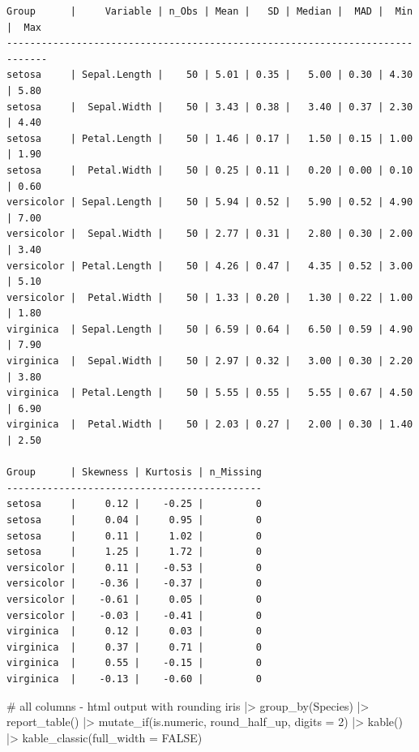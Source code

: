 \documentclass[
  letterpaper,
  DIV=11,
  numbers=noendperiod]{scrreprt}
\newenvironment{Shaded}{\begin{snugshade}}{\end{snugshade}}
\newcommand{\AttributeTok}[1]{\textcolor[rgb]{0.40,0.45,0.13}{#1}}
\newcommand{\CommentTok}[1]{\textcolor[rgb]{0.37,0.37,0.37}{#1}}
\newcommand{\ConstantTok}[1]{\textcolor[rgb]{0.56,0.35,0.01}{#1}}
\newcommand{\DecValTok}[1]{\textcolor[rgb]{0.68,0.00,0.00}{#1}}
\newcommand{\FunctionTok}[1]{\textcolor[rgb]{0.28,0.35,0.67}{#1}}
\newcommand{\NormalTok}[1]{\textcolor[rgb]{0.00,0.23,0.31}{#1}}
\newcommand{\SpecialCharTok}[1]{\textcolor[rgb]{0.37,0.37,0.37}{#1}}
\begin{document}
\begin{verbatim}
Group      |     Variable | n_Obs | Mean |   SD | Median |  MAD |  Min |  Max
-----------------------------------------------------------------------------
setosa     | Sepal.Length |    50 | 5.01 | 0.35 |   5.00 | 0.30 | 4.30 | 5.80
setosa     |  Sepal.Width |    50 | 3.43 | 0.38 |   3.40 | 0.37 | 2.30 | 4.40
setosa     | Petal.Length |    50 | 1.46 | 0.17 |   1.50 | 0.15 | 1.00 | 1.90
setosa     |  Petal.Width |    50 | 0.25 | 0.11 |   0.20 | 0.00 | 0.10 | 0.60
versicolor | Sepal.Length |    50 | 5.94 | 0.52 |   5.90 | 0.52 | 4.90 | 7.00
versicolor |  Sepal.Width |    50 | 2.77 | 0.31 |   2.80 | 0.30 | 2.00 | 3.40
versicolor | Petal.Length |    50 | 4.26 | 0.47 |   4.35 | 0.52 | 3.00 | 5.10
versicolor |  Petal.Width |    50 | 1.33 | 0.20 |   1.30 | 0.22 | 1.00 | 1.80
virginica  | Sepal.Length |    50 | 6.59 | 0.64 |   6.50 | 0.59 | 4.90 | 7.90
virginica  |  Sepal.Width |    50 | 2.97 | 0.32 |   3.00 | 0.30 | 2.20 | 3.80
virginica  | Petal.Length |    50 | 5.55 | 0.55 |   5.55 | 0.67 | 4.50 | 6.90
virginica  |  Petal.Width |    50 | 2.03 | 0.27 |   2.00 | 0.30 | 1.40 | 2.50

Group      | Skewness | Kurtosis | n_Missing
--------------------------------------------
setosa     |     0.12 |    -0.25 |         0
setosa     |     0.04 |     0.95 |         0
setosa     |     0.11 |     1.02 |         0
setosa     |     1.25 |     1.72 |         0
versicolor |     0.11 |    -0.53 |         0
versicolor |    -0.36 |    -0.37 |         0
versicolor |    -0.61 |     0.05 |         0
versicolor |    -0.03 |    -0.41 |         0
virginica  |     0.12 |     0.03 |         0
virginica  |     0.37 |     0.71 |         0
virginica  |     0.55 |    -0.15 |         0
virginica  |    -0.13 |    -0.60 |         0
\end{verbatim}

\begin{Shaded}
\begin{Highlighting}[]
\CommentTok{\# all columns {-} html output with rounding}
\NormalTok{iris }\SpecialCharTok{|\textgreater{}}
  \FunctionTok{group\_by}\NormalTok{(Species) }\SpecialCharTok{|\textgreater{}}
  \FunctionTok{report\_table}\NormalTok{() }\SpecialCharTok{|\textgreater{}}
  \FunctionTok{mutate\_if}\NormalTok{(is.numeric, round\_half\_up, }\AttributeTok{digits =} \DecValTok{2}\NormalTok{) }\SpecialCharTok{|\textgreater{}}
  \FunctionTok{kable}\NormalTok{() }\SpecialCharTok{|\textgreater{}}
  \FunctionTok{kable\_classic}\NormalTok{(}\AttributeTok{full\_width =} \ConstantTok{FALSE}\NormalTok{)}
\end{Highlighting}
\end{Shaded}
\end{document}
